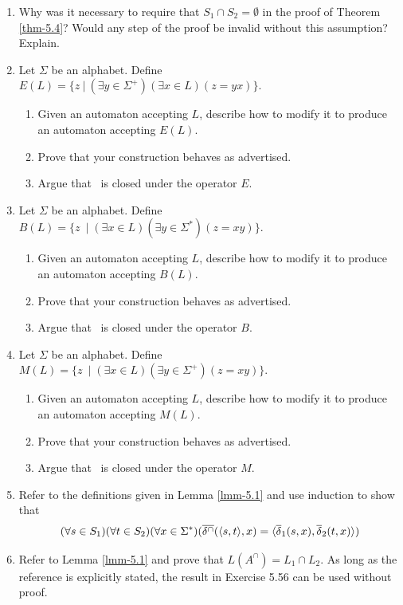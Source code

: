 \begin{enumerate}[{5.}1. ]
\item Why was it necessary to require that $S_1 \cap S_2 = \emptyset$ in the
proof of Theorem \ref{thm-5.4}? Would any step of the proof be invalid without this
assumption? Explain.

\item Let $\Sigma$ be an alphabet. Define $E(L)=\{z\ |\ (\exists y \in \Sigma^+)
	(\exists x \in L)(z = yx)\}$.
\begin{enumerate}
\item Given an automaton accepting $L$, describe how to modify it to produce an
automaton accepting $E(L)$.
\item Prove that your construction behaves as advertised.
\item Argue that \DSIG\ is closed under the operator $E$.
\end{enumerate}

\item Let $\Sigma$ be an alphabet. Define
$B(L)=\{z\  \mid (\exists x\in L)(\exists y \in \Sigma^*)(z = xy)\}$.
\begin{enumerate}
\item Given an automaton accepting $L$, describe how to modify it to produce an
automaton accepting $B(L)$.
\item Prove that your construction behaves as advertised.
\item Argue that \DSIG\ is closed under the operator $B$.
\end{enumerate}

\item Let $\Sigma$ be an alphabet. Define
$M(L)=\{z\  \mid (\exists x \in L)(\exists y \in \Sigma^+)(z = xy)\}$.
\begin{enumerate}
\item Given an automaton accepting $L$, describe how to modify it to produce an
automaton accepting $M(L)$.
\item Prove that your construction behaves as advertised.
\item Argue that \DSIG\ is closed under the operator $M$.
\end{enumerate}

\item Refer to the definitions given in Lemma \ref{lmm-5.1} and use induction to show
that
\[ (\forall s \in S_1)(\forall t \in S_2)(\forall x \in \Sigma^*)(\overline{\delta^\cap}
	(\langle s,t\rangle,x) = \langle\overline{\delta}_1(s,x),\overline{\delta}_2(t,x)\rangle ) \]

\item Refer to Lemma \ref{lmm-5.1} and prove that $L(A^\cap)=L_1 \cap L_2$. As long as the
reference is explicitly stated, the result in Exercise 5.56 can be used without
proof.


\end{enumerate}
